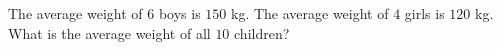 The average weight of $6$ boys is $150$ kg. The average weight of $4$ girls is $120$ kg. What is the average weight of all $10$ children?
